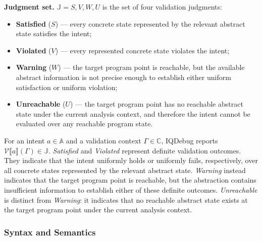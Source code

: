 \documentclass[11pt,oneside]{report}
\theoremstyle{plain}
\theoremstyle{definition}
\theoremstyle{remark}
\begin{document}
\smallskip
\noindent\textbf{Judgment set.}
$\mathbb{J} = {S,V,W,U}$ is the set of four validation judgments:
\begin{itemize}
    \item \textbf{Satisfied} ($S$) --- every concrete state represented by the
    relevant abstract state satisfies the intent;
    \item \textbf{Violated} ($V$) --- every represented concrete state violates
    the intent;
    \item \textbf{Warning} ($W$) --- the target program point is reachable, but
    the available abstract information is not precise enough to establish
    either uniform satisfaction or uniform violation;
    \item \textbf{Unreachable} ($U$) --- the target program point has no
    reachable abstract state under the current analysis context, and therefore
    the intent cannot be evaluated over any reachable program state.
\end{itemize}

For an intent $a \in \mathbb{A}$ and a validation context
$\Gamma \in \mathbb{C}$, IQDebug reports
$\mathcal{V}\llbracket a \rrbracket(\Gamma) \in \mathbb{J}$.
\textit{Satisfied} and \textit{Violated} represent definite validation outcomes.
They indicate that the intent uniformly holds or uniformly fails, respectively,
over all concrete states represented by the relevant abstract state.
\textit{Warning} instead indicates that the target program point is reachable,
but the abstraction contains insufficient information to establish either of
these definite outcomes.
\textit{Unreachable} is distinct from \textit{Warning}: it indicates that no
reachable abstract state exists at the target program point under the current
analysis context.

\subsubsection{Syntax and Semantics}\label{sec:intent-semantics}
\end{document}
